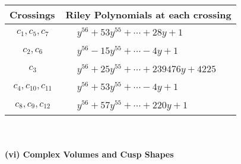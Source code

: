 \documentclass[1p]{elsarticle_modified}
\theoremstyle{definition}
\begin{document}
\begin{tabular}{m{50pt}|m{274pt}}
Crossings & \hspace{64pt}Riley Polynomials at each crossing \\
\hline $$\begin{aligned}c_{1},c_{5},c_{7}\end{aligned}$$&$\begin{aligned}
&y^{56}+53 y^{55}+\cdots+28 y+1
\end{aligned}$\\
\hline $$\begin{aligned}c_{2},c_{6}\end{aligned}$$&$\begin{aligned}
&y^{56}-15 y^{55}+\cdots-4 y+1
\end{aligned}$\\
\hline $$\begin{aligned}c_{3}\end{aligned}$$&$\begin{aligned}
&y^{56}+25 y^{55}+\cdots+239476 y+4225
\end{aligned}$\\
\hline $$\begin{aligned}c_{4},c_{10},c_{11}\end{aligned}$$&$\begin{aligned}
&y^{56}+53 y^{55}+\cdots-4 y+1
\end{aligned}$\\
\hline $$\begin{aligned}c_{8},c_{9},c_{12}\end{aligned}$$&$\begin{aligned}
&y^{56}+57 y^{55}+\cdots+220 y+1
\end{aligned}$\\
\hline
\end{tabular}\\~\\
\newpage\flushleft \textbf{(vi) Complex Volumes and Cusp Shapes}
\end{document}
